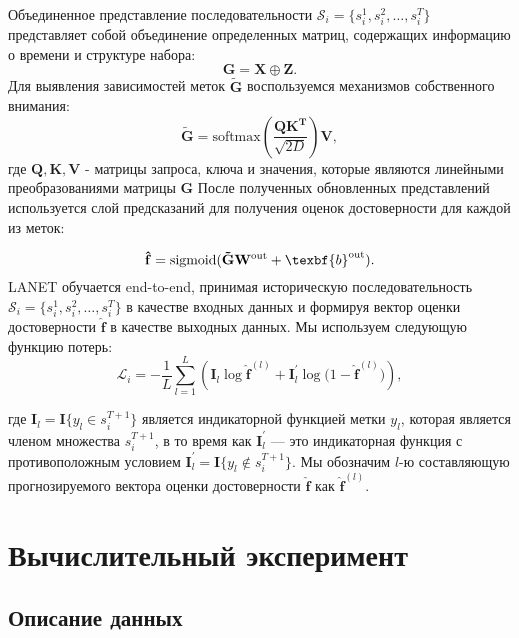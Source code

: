 \documentclass[a4paper, 12pt]{article} %
\begin{document}
Объединенное представление последовательности $\mathcal{S}_i = \{s_i^1, s_i^2, \dots, s_i^T\}$ представляет собой объединение определенных матриц, содержащих информацию о времени и структуре набора:
\begin{equation}
    \mathbf{G} = \mathbf{X} \oplus \mathbf{Z}. 
\end{equation} 
Для выявления зависимостей меток $\mathbf {\tilde{G}}$ воспользуемся механизмов собственного внимания:
\begin{equation}
    \mathbf{\tilde{G}}=\text{softmax}(\frac{\mathbf{Q}\mathbf{K^ T}}{\sqrt{2D}})\mathbf{V},
\end{equation} 
где $\mathbf{Q}, \mathbf{K}, \mathbf{V}$ - матрицы запроса, ключа и значения, которые являются линейными преобразованиями матрицы $\mathbf{G}$
После полученных обновленных представлений используется слой предсказаний для получения оценок достоверности для каждой из меток:

\begin{equation}
    \mathbf{\hat{f}} = \text{sigmoid}(\mathbf{\tilde{G}} \mathbf{W}^{\text{out}} + \texbf{b}^{\text{out}}). 
\end{equation} 
LANET обучается end-to-end, принимая историческую последовательность
$\mathcal {S}_i = \{s_i^1, s_i^ 2, \dots, s_i^T\}$ в качестве входных данных и формируя вектор оценки достоверности $\mathbf{\hat{f}}$ в качестве выходных данных. Мы используем следующую функцию потерь:
\begin{equation}
    \mathcal{L}_i = -\frac{1}{L}\sum_{l=1}^L \left(\mathbf{I}_l \log{\mathbf{\hat{f}}}^{(l)} +
\mathbf{I}_l^{'} \log{(1-\mathbf{\hat{f}}}^{(l)}) \right),
\end{equation} 

где $\mathbf{I}_l = \mathbf{I}\{ y_l \in s_i^{T+1} \}$ является индикаторной функцией метки $y_l$, которая является членом множества $s_i^{T+1}$, в то время как $\mathbf{I}_l^{'}$ --- это индикаторная функция с противоположным условием $\mathbf{I}_l^{'}  = \mathbf{I}\{ y_l \notin s_i^{T+1} \}$. Мы обозначим $l$-ю составляющую прогнозируемого вектора оценки достоверности $\mathbf{\hat{f}}$ как $\mathbf{\hat{f}}^{(l)}$.


\section{Вычислительный эксперимент}

\subsection{Описание данных}
\end{document}
